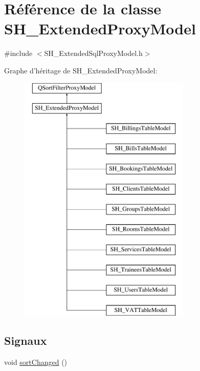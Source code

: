 \hypertarget{classSH__ExtendedProxyModel}{\section{Référence de la classe S\-H\-\_\-\-Extended\-Proxy\-Model}
\label{classSH__ExtendedProxyModel}
}


{\ttfamily \#include $<$S\-H\-\_\-\-Extended\-Sql\-Proxy\-Model.\-h$>$}

Graphe d'héritage de S\-H\-\_\-\-Extended\-Proxy\-Model\-:\begin{figure}[H]
\begin{center}
\leavevmode
\includegraphics[height=12.000000cm]{classSH__ExtendedProxyModel}
\end{center}
\end{figure}
\subsection*{Signaux}
\begin{DoxyCompactItemize}
\item 
void \hyperlink{classSH__ExtendedProxyModel_ad34f69425d6c86a2671cf9f85562a724}{sort\-Changed} ()
\end{DoxyCompactItemize}
